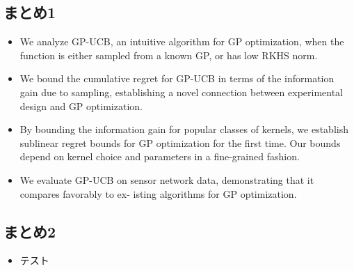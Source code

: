 \documentclass[dvipdfmx, 10.5pt]{beamer}
\begin{document}

\subsection{まとめ1}

\begin{frame}{\insertsubsection}
	\begin{itemize}
		\item We analyze GP-UCB, an intuitive algorithm for GP optimization, when the function is either sampled from a known GP, or has low RKHS norm.
		\item We bound the cumulative regret for GP-UCB in terms of the information gain due to sampling, establishing a novel connection between experimental design and GP optimization.
		\item By bounding the information gain for popular classes of kernels, we establish sublinear regret bounds for GP optimization for the first time. Our bounds depend on kernel choice and parameters in a fine-grained fashion.
		\item We evaluate GP-UCB on sensor network data, demonstrating that it compares favorably to ex- isting algorithms for GP optimization.
	\end{itemize}

\end{frame}


\subsection{まとめ2}
\begin{frame}{\insertsubsection}
	\begin{itemize}
		\item テスト
	\end{itemize}

\end{frame}

\end{document}

